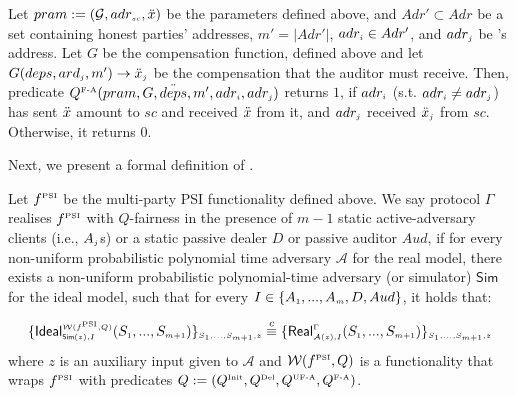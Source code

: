   
\begin{definition}  
 Let $pram:=(\mathcal{G}, adr_{\scriptscriptstyle sc}, \ddot{x})$ be the parameters defined above, and $Adr'\subset Adr$ be a set containing honest parties' addresses, $m' = |Adr'|$,     $adr_{\scriptscriptstyle i}\in Adr'$, and  $adr_{\scriptscriptstyle j}$ be \aud's address. Let $G$ be the compensation function, defined above and let $G(deps, ard_{\scriptscriptstyle j}, m')\rightarrow \ddot{x}_{\scriptscriptstyle j}$ be the compensation that the auditor must receive.  Then, predicate $Q^{\scriptscriptstyle \text{F-A}}(pram, G, \ddot{deps}, m', adr_{\scriptscriptstyle i}, adr_{\scriptscriptstyle j})$ returns $1$, if $adr_{\scriptscriptstyle i}$ (s.t. $adr_{\scriptscriptstyle i}\neq adr_{\scriptscriptstyle j}$) has sent $\ddot{x}$ amount to $sc$ and received  $\ddot{x}$  from it, and $adr_{\scriptscriptstyle j}$ received $\ddot{x}_{\scriptscriptstyle j}$  from $sc$. Otherwise, it returns $0$. 
 \end{definition}
  
  
  
 
 Next, we present a formal definition of \p. %
 
\begin{definition}[\p]\label{def::PSI-Q-fair}
Let $f^{\scriptscriptstyle \text{PSI}}$ be the multi-party PSI functionality defined above. We say  protocol $\Gamma$ realises  $f^{\scriptscriptstyle \text{PSI}}$ with $Q$-fairness in the presence of $m-1$ static active-adversary clients (i.e., $A_{\scriptscriptstyle j}$s) or a static passive dealer $D$ or passive auditor $Aud$, if for every non-uniform probabilistic polynomial time adversary $\mathcal{A}$ for the real model, there exists a non-uniform probabilistic polynomial-time adversary (or simulator) $\mathsf{Sim}$ for the ideal model, such that for every $I\in \{A_{\scriptscriptstyle 1},...,A_{\scriptscriptstyle m}, D, Aud\}$, it holds that: 

\begin{equation*}
\{\mathsf {Ideal}^{\scriptscriptstyle \mathcal{W}(f^{\scriptscriptstyle \text{PSI}},Q)}_{\scriptscriptstyle \mathsf{Sim}(z), I}(S_{\scriptscriptstyle 1},..., S_{\scriptscriptstyle m+1})\}_{\scriptscriptstyle S_{\scriptscriptstyle 1},..., S_{\scriptscriptstyle m+1},z}\stackrel{c}{\equiv} \{\mathsf{Real}_{\scriptscriptstyle \mathcal{A}(z), I}^{\scriptscriptstyle \Gamma}(S_{\scriptscriptstyle 1},..., S_{\scriptscriptstyle m+1}) \}_{\scriptscriptstyle S_{\scriptscriptstyle 1},..., S_{\scriptscriptstyle m+1},z}
\end{equation*}
where  $z$ is an auxiliary input given to $\mathcal{A}$ and  $\mathcal{W}(f^{\scriptscriptstyle \text{PSI}},Q)$ is a functionality that wraps $f^{\scriptscriptstyle \text{PSI}}$ with predicates $Q:=(Q^{\scriptscriptstyle \text{Init}}, Q^{\scriptscriptstyle \text{Del}}, Q^{\scriptscriptstyle \text{UF-A}}, Q^{\scriptscriptstyle \text{F-A}})$. 
  \end{definition}
 
